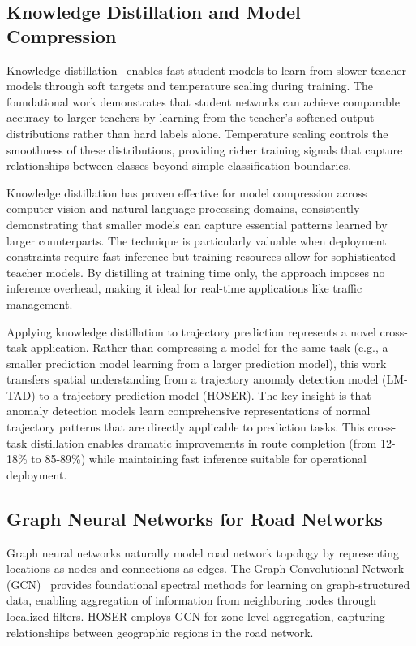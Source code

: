 \subsection{Knowledge Distillation and Model Compression}
\label{sec:lit-distill}

Knowledge distillation~\cite{hintonDistillingKnowledgeNeural2015} enables fast student models to learn from slower teacher models through soft targets and temperature scaling during training. The foundational work demonstrates that student networks can achieve comparable accuracy to larger teachers by learning from the teacher's softened output distributions rather than hard labels alone. Temperature scaling controls the smoothness of these distributions, providing richer training signals that capture relationships between classes beyond simple classification boundaries.

Knowledge distillation has proven effective for model compression across computer vision and natural language processing domains, consistently demonstrating that smaller models can capture essential patterns learned by larger counterparts. The technique is particularly valuable when deployment constraints require fast inference but training resources allow for sophisticated teacher models. By distilling at training time only, the approach imposes no inference overhead, making it ideal for real-time applications like traffic management.

Applying knowledge distillation to trajectory prediction represents a novel cross-task application. Rather than compressing a model for the same task (e.g., a smaller prediction model learning from a larger prediction model), this work transfers spatial understanding from a trajectory anomaly detection model (LM-TAD) to a trajectory prediction model (HOSER). The key insight is that anomaly detection models learn comprehensive representations of normal trajectory patterns that are directly applicable to prediction tasks. This cross-task distillation enables dramatic improvements in route completion (from 12-18\% to 85-89\%) while maintaining fast inference suitable for operational deployment.

\subsection{Graph Neural Networks for Road Networks}
\label{sec:lit-gnn}

Graph neural networks naturally model road network topology by representing locations as nodes and connections as edges. The Graph Convolutional Network (GCN)~\cite{kipfSemisupervisedClassificationGraph2017} provides foundational spectral methods for learning on graph-structured data, enabling aggregation of information from neighboring nodes through localized filters. HOSER employs GCN for zone-level aggregation, capturing relationships between geographic regions in the road network.

